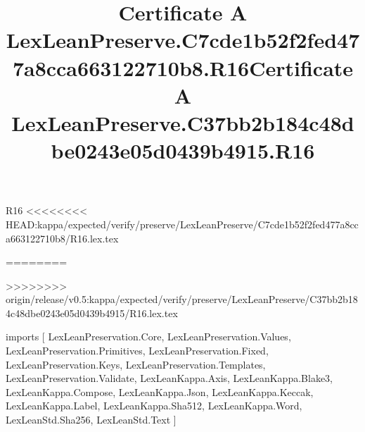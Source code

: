 \begin{lexlean}{R16}
<<<<<<<< HEAD:kappa/expected/verify/preserve/LexLeanPreserve/C7cde1b52f2fed477a8cca663122710b8/R16.lex.tex
\title{Certificate A LexLeanPreserve.C7cde1b52f2fed477a8cca663122710b8.R16}
========
\title{Certificate A LexLeanPreserve.C37bb2b184c48dbe0243e05d0439b4915.R16}
>>>>>>>> origin/release/v0.5:kappa/expected/verify/preserve/LexLeanPreserve/C37bb2b184c48dbe0243e05d0439b4915/R16.lex.tex
\begin{coremodule}
imports [
  LexLeanPreservation.Core,
  LexLeanPreservation.Values,
  LexLeanPreservation.Primitives,
  LexLeanPreservation.Fixed,
  LexLeanPreservation.Keys,
  LexLeanPreservation.Templates,
  LexLeanPreservation.Validate,
  LexLeanKappa.Axis,
  LexLeanKappa.Blake3,
  LexLeanKappa.Compose,
  LexLeanKappa.Json,
  LexLeanKappa.Keccak,
  LexLeanKappa.Label,
  LexLeanKappa.Sha512,
  LexLeanKappa.Word,
  LexLeanStd.Sha256,
  LexLeanStd.Text
]


\end{coremodule}
\end{lexlean}
